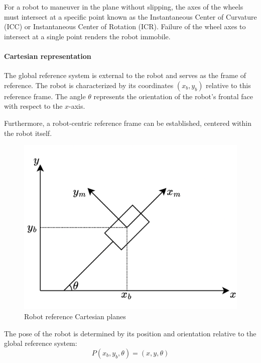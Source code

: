 For a robot to maneuver in the plane without slipping, the axes of the wheels must intersect at a specific point known as the Instantaneous Center of Curvature (ICC) or Instantaneous Center of Rotation (ICR).
Failure of the wheel axes to intersect at a single point renders the robot immobile.

\paragraph*{Cartesian representation}
The global reference system is external to the robot and serves as the frame of reference.
The robot is characterized by its coordinates $(x_b, y_b)$ relative to this reference frame. 
The angle $\theta$ represents the orientation of the robot's frontal face with respect to the $x$-axis.

Furthermore, a robot-centric reference frame can be established, centered within the robot itself.
\begin{figure}[H]
    \centering
    \includegraphics[width=0.5\linewidth]{images/ref.png} 
    \caption{Robot reference Cartesian planes}
\end{figure}
The pose of the robot is determined by its position and orientation relative to the global reference system:
\[P(x_b,y_b,\theta)=(x,y,\theta)\]